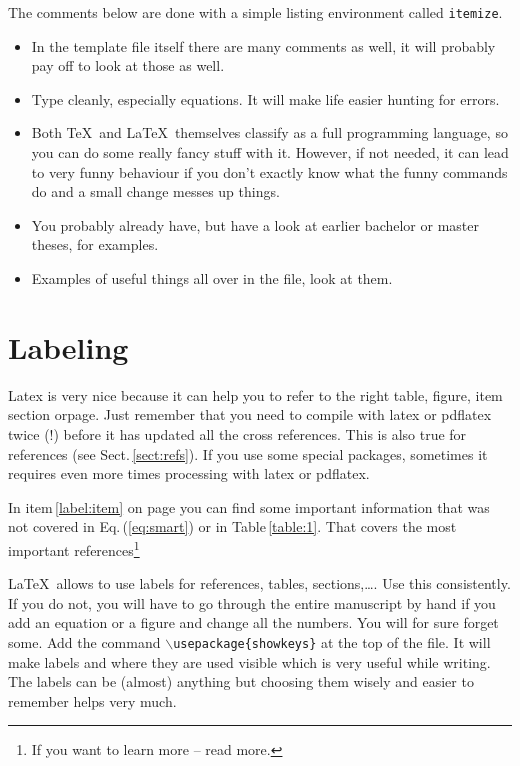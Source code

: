 \documentclass[a4paper,12pt]{article}
\begin{document}
The comments below are done with a simple listing environment called
{\tt itemize}.
\begin{itemize}
\item
In the template file itself there are many comments as well, it will probably
pay off to look at those as well.
\item
Type cleanly, especially equations. It will make life easier hunting for errors.
\item
Both \TeX\ and \LaTeX\ themselves classify as a full programming language, so
you can do some really fancy stuff with it. However, if not needed, it can
lead to very funny behaviour if you don't exactly know what the funny
commands do and a small change messes up things.
\item
You probably already have, but have a look at earlier bachelor or master 
theses, for examples.
\item
Examples of useful things all over in the file, look at them.
\end{itemize}

\section{Labeling}
\setcounter{equation}{0}
\label{sec:labeling}


Latex is very nice because it can help you to refer to the right table, figure,
item section orpage. Just remember that you need to compile with latex or
pdflatex twice (!) before it has updated all the cross references. This is also
true for references (see Sect.\,\ref{sect:refs}). If you use some special
packages, sometimes it requires even more times processing with latex
or pdflatex.

In item\,\ref{label:item} on page \pageref{label:item} you can find some
important information that was not covered in Eq.\,(\ref{eq:smart}) or in
Table\,\ref{table:1}. That covers the most important references\footnote{If you
want to learn more -- read more.}

\LaTeX\ allows to use labels for references, tables, sections,\ldots.
Use this consistently. If you do not, you will have to go through the entire
manuscript by hand if you add an equation or a figure and change all the
numbers. You will for sure forget some. Add the command
{\tt {$\backslash$}usepackage\{showkeys\}} at the top of the file. It will make
labels and where they are used visible which is very useful while writing.
The labels can be (almost) anything but choosing them wisely and easier
to remember helps very much.
\end{document}
